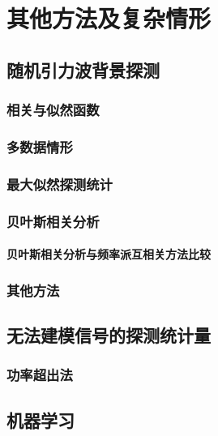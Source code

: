 
\chapter{其他方法及复杂情形}
\label{chap8}

\section{随机引力波背景探测}
\subsection{相关与似然函数}
\subsection{多数据情形}
\subsection{最大似然探测统计}
\subsection{贝叶斯相关分析}
\subsubsection{贝叶斯相关分析与频率派互相关方法比较}
\subsection{其他方法}

\section{无法建模信号的探测统计量}
\subsection{功率超出法}

\section{机器学习}

